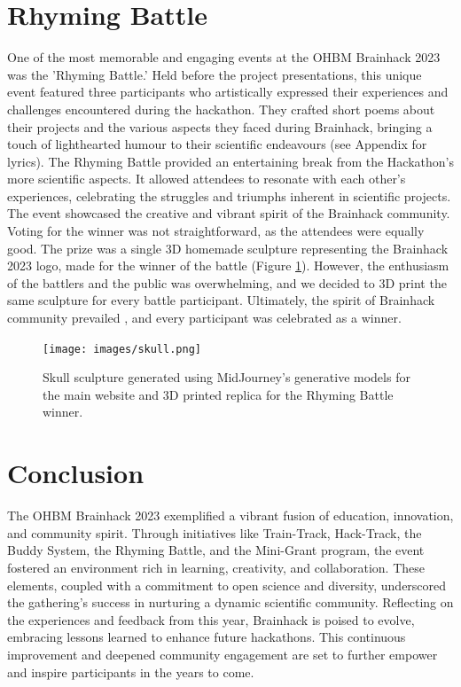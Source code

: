 \documentclass{article}
\begin{document}
\section{Rhyming Battle}

One of the most memorable and engaging events at the OHBM Brainhack 2023 was the 'Rhyming Battle.'
Held before the project presentations, this unique event featured three participants who artistically expressed their experiences and challenges encountered during the hackathon.
They crafted short poems about their projects and the various aspects they faced during Brainhack, bringing a touch of lighthearted humour to their scientific endeavours (see Appendix for lyrics).
The Rhyming Battle provided an entertaining break from the Hackathon's more scientific aspects.
It allowed attendees to resonate with each other's experiences, celebrating the struggles and triumphs inherent in scientific projects.
The event showcased the creative and vibrant spirit of the Brainhack community.
Voting for the winner was not straightforward, as the attendees were equally good.
The prize was a single 3D homemade sculpture representing the Brainhack 2023 logo, made for the winner of the battle (Figure \ref{fig:skull}).
However, the enthusiasm of the battlers and the public was overwhelming, and we decided to 3D print the same sculpture for every battle participant.
Ultimately, the spirit of Brainhack community prevailed \cite{gau2021brainhack,levitis2021centering}, and every participant was celebrated as a winner.

\begin{figure}[hbt!]
    \centering
    \texttt{[image: images/skull.png]}
    \label{fig:skull}
    \caption{
        Skull sculpture generated using MidJourney's generative models for the main website and 3D printed replica for the Rhyming Battle winner.
    }
\end{figure}

\section{Conclusion}

The OHBM Brainhack 2023 exemplified a vibrant fusion of education, innovation, and community spirit.
Through initiatives like Train-Track, Hack-Track, the Buddy System, the Rhyming Battle, and the Mini-Grant program, the event fostered an environment rich in learning, creativity, and collaboration.
These elements, coupled with a commitment to open science and diversity, underscored the gathering's success in nurturing a dynamic scientific community.
Reflecting on the experiences and feedback from this year, Brainhack is poised to evolve, embracing lessons learned to enhance future hackathons.
This continuous improvement and deepened community engagement are set to further empower and inspire participants in the years to come.



\end{document}
